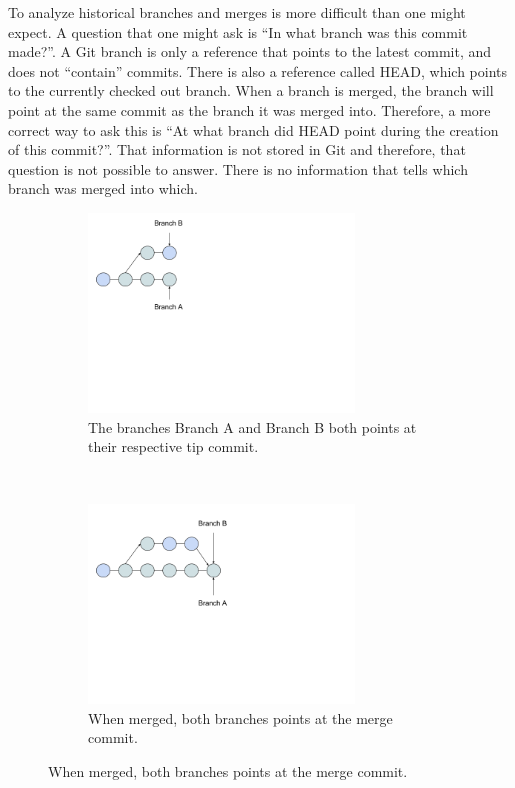 To analyze historical branches and merges is more difficult than one might expect. A question that one might ask is “In what branch was this commit made?”. A Git branch is only a reference that points to the latest commit, and does not “contain” commits. There is also a reference called HEAD, which points to the currently checked out branch. When a branch is merged, the branch will point at the same commit as the branch it was merged into. Therefore, a more correct way to ask this is “At what branch did HEAD point during the creation of this commit?”. That information is not stored in Git and therefore, that question is not possible to answer. There is no information that tells which branch was merged into which.
\begin{figure}
   \centering
   \begin{subfigure}[b]{0.3\textwidth}
       \includegraphics[width=200pt]{figure/branch1.png}
       \caption{The branches Branch A and Branch B both points at their respective tip commit.}
       \label{fig:mbranch1}
   \end{subfigure}
   ~ %
   \begin{subfigure}[b]{0.3\textwidth}
       \includegraphics[width=200pt]{figure/branch2.png}
       \caption{When merged, both branches points at the merge commit.}
       \label{fig:mbranch2}
   \end{subfigure}

\end{figure}
